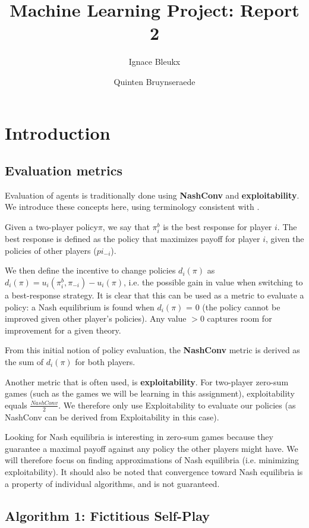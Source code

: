 \documentclass[10pt,a4paper]{article}
\title{Machine Learning Project: Report 2}
\author{Ignace Bleukx \and Quinten Bruynseraede}
\begin{document}
\maketitle
\section{Introduction}
\subsection{Evaluation metrics}
Evaluation of agents is traditionally done using \textbf{NashConv} and \textbf{exploitability}. We introduce these concepts here, using terminology consistent with \citeauthor{lanctot2019openspiel} \citep{lanctot2019openspiel}.

Given a two-player policy$\pi$, we say that $\pi^{b}_{i}$ is the best response for player $i$. The best response is defined as the policy that maximizes payoff for player $i$, given the policies of other players ($pi_{-i}$). 

We then define the incentive to change policies $d_{i}(\pi)$ as $d_{i}(\pi) = u_{i}(\pi^{b}_{i},\pi_{-i}) - u_{i}(\pi)$, i.e. the possible gain in value when switching to a best-response strategy. It is clear that this can be used as a metric to evaluate a policy: a Nash equilibrium is found when $d_{i}(\pi)$ = 0 (the policy cannot be improved given other player's policies). Any value $>0$ captures room for improvement for a given theory. 

From this initial notion of policy evaluation, the \textbf{NashConv} metric is derived as the sum of $d_{i}(\pi)$ for both players.

Another metric that is often used, is \textbf{exploitability}. For two-player zero-sum games (such as the games we will be learning in this assignment), exploitability equals $\frac{NashConv}{2}$. We therefore only use Exploitability to evaluate our policies (as NashConv can be derived from Exploitability in this case).

Looking for Nash equilibria is interesting in zero-sum games because they guarantee a maximal payoff against any policy the other players might have. We will therefore focus on finding approximations of Nash equilibria (i.e. minimizing exploitability). It should also be noted that convergence toward Nash equilibria is a property of individual algorithms, and is not guaranteed.

\subsection{Algorithm 1: Fictitious Self-Play}
\end{document}
